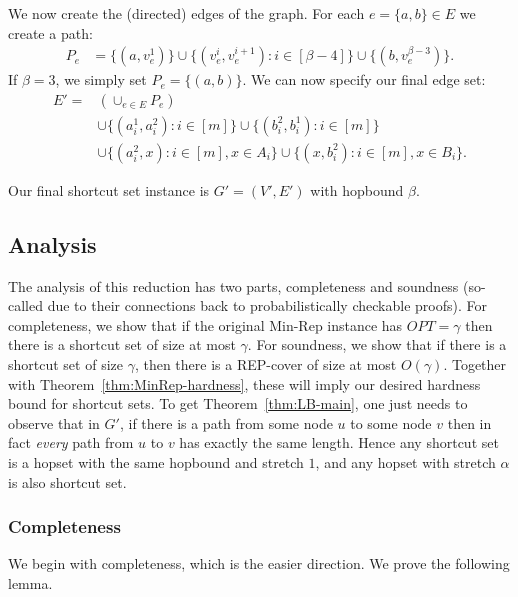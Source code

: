 We now create the (directed) edges of the graph.  For each $e = \{a,b\} \in E$ we create a path:
\begin{align*}
    P_e &= \{(a, v_e^1)\} \cup \{(v_e^i, v_e^{i+1}) : i \in [\beta-4]\} \cup \{(b, v_e^{\beta-3})\}.
\end{align*}
If $\beta = 3$, we simply set $P_e = \{(a,b)\}$.  We can now specify our final edge set:
\begin{align*}
    E' = &\left(\cup_{e \in E} P_e\right) \\
    &\cup \{(a_i^1, a_i^2) : i \in [m]\} \cup \{(b_i^2, b_i^1) : i \in [m]\} \\
    &\cup \{(a_i^2, x) : i \in [m], x \in A_i\} \cup \{(x, b_i^2) : i \in [m], x \in B_i\}.
\end{align*}

Our final shortcut set instance is $G' = (V', E')$ with hopbound $\beta$.

\subsection{Analysis}
The analysis of this reduction has two parts, completeness and soundness (so-called due to their connections back to probabilistically checkable proofs).  For completeness, we show that if the original Min-Rep instance has $OPT = \gamma$ then there is a shortcut set of size at most $\gamma$.  For soundness, we show that if there is a shortcut set of size $\gamma$, then there is a REP-cover of size at most $O(\gamma)$.  Together with Theorem~\ref{thm:MinRep-hardness}, these will imply our desired hardness bound for shortcut sets.  To get Theorem~\ref{thm:LB-main}, one just needs to observe that in $G'$, if there is a path from some node $u$ to some node $v$ then in fact \emph{every} path from $u$ to $v$ has exactly the same length.  Hence any shortcut set is a hopset with the same hopbound and stretch $1$, and any hopset with stretch $\alpha$ is also shortcut set.

\subsubsection{Completeness}
We begin with completeness, which is the easier direction.  We prove the following lemma.

